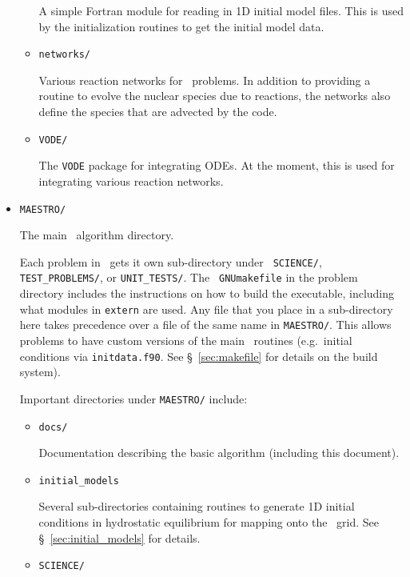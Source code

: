 \begin{itemize}
\begin{itemize}
    A simple Fortran module for reading in 1D initial model files.
    This is used by the initialization routines to get the initial
    model data.

  \item {\tt networks/}

    Various reaction networks for \maestro\ problems.  In addition to
    providing a routine to evolve the nuclear species due to
    reactions, the networks also define the species that are advected
    by the code.

  \item {\tt VODE/}

    The {\tt VODE} \cite{vode} package for integrating ODEs.  At the
    moment, this is used for integrating various reaction networks.
 
  \end{itemize}

\item {\tt MAESTRO/}

  The main \maestro\ algorithm directory.  

  Each problem in \maestro\ gets it own sub-directory under {\tt
    SCIENCE/}, {\tt TEST\_PROBLEMS/}, or {\tt UNIT\_TESTS/}.  The {\tt
    GNUmakefile} in the problem directory includes the instructions on
  how to build the executable, including what modules in {\tt extern}
  are used.  Any file that you place in a sub-directory here takes
  precedence over a file of the same name in {\tt MAESTRO/}.  This
  allows problems to have custom versions of the main
  \maestro\ routines (e.g.\ initial conditions via {\tt initdata.f90}.
  See \S~\ref{sec:makefile} for details on the build system).

  Important directories under {\tt MAESTRO/} include:

  \begin{itemize}

  \item {\tt docs/}

    Documentation describing the basic algorithm (including this
    document).

  \item {\tt initial\_models}

    Several sub-directories containing routines to generate 1D initial
    conditions in hydrostatic equilibrium for mapping onto the
    \maestro\ grid.  See \S~\ref{sec:initial_models} for details.

  \item {\tt SCIENCE/}


\end{itemize}
\end{itemize}
